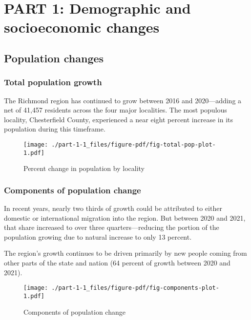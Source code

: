 \documentclass[
  letterpaper,
  DIV=11,
  numbers=noendperiod]{scrreprt}
\begin{document}
\part{PART 1: Demographic and socioeconomic changes}

\hypertarget{part-1-1}{%
\chapter{Population changes}\label{part-1-1}}

\hypertarget{total-population-growth}{%
\section{Total population growth}\label{total-population-growth}}

The Richmond region has continued to grow between 2016 and 2020---adding
a net of 41,457 residents across the four major localities. The most
populous locality, Chesterfield County, experienced a near eight percent
increase in its population during this timeframe.

\begin{figure}

{\centering \texttt{[image: ./part-1-1\_files/figure-pdf/fig-total-pop-plot-1.pdf]}

}

\caption{\label{fig-total-pop-plot}Percent change in population by
locality}

\end{figure}

\hypertarget{components-of-population-change}{%
\section{Components of population
change}\label{components-of-population-change}}

In recent years, nearly two thirds of growth could be attributed to
either domestic or international migration into the region. But between
2020 and 2021, that share increased to over three quarters---reducing
the portion of the population growing due to natural increase to only 13
percent.

The region's growth continues to be driven primarily by new people
coming from other parts of the state and nation (64 percent of growth
between 2020 and 2021).

\begin{figure}

{\centering \texttt{[image: ./part-1-1\_files/figure-pdf/fig-components-plot-1.pdf]}

}

\caption{\label{fig-components-plot}Components of population change}

\end{figure}
\end{document}
